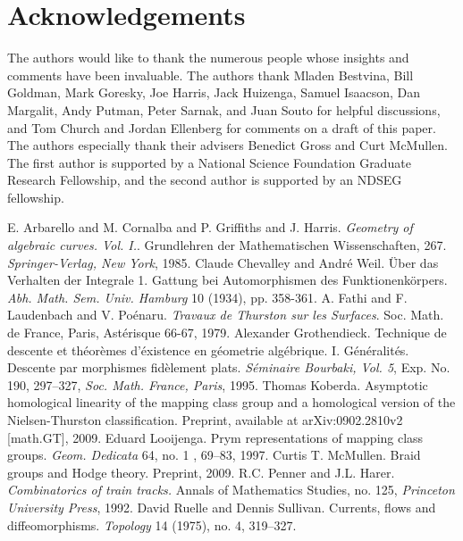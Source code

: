 \documentclass[11pt]{amsart}
\numberwithin{thm}{section}
\begin{document}
\section{Acknowledgements}
The authors would like to thank the numerous people whose insights and comments have been invaluable.  The authors thank Mladen Bestvina, Bill Goldman, Mark Goresky, Joe Harris, Jack Huizenga, Samuel Isaacson, Dan Margalit, Andy Putman, Peter Sarnak, and Juan Souto for helpful discussions, and Tom Church and Jordan Ellenberg for comments on a draft of this paper.  The authors especially thank their advisers Benedict Gross and Curt McMullen.  The first author is supported by a National Science Foundation Graduate Research Fellowship, and the second author is supported by an NDSEG fellowship.

\begin{thebibliography}{99}
E. Arbarello and M. Cornalba and P. Griffiths and J. Harris.  {\it Geometry of algebraic curves. Vol. I.}.  Grundlehren der Mathematischen Wissenschaften, 267.  {\it Springer-Verlag, New York}, 1985.
Claude Chevalley and Andr\'e Weil.  \"Uber das Verhalten der Integrale 1. Gattung bei Automorphismen des Funktionenk\"orpers.  {\it Abh. Math. Sem. Univ. Hamburg} 10 (1934), pp. 358-361.
A. Fathi and F. Laudenbach and V. Po\'enaru.  {\it Travaux de Thurston sur les Surfaces}.  Soc. Math. de France, Paris,  Ast\'erisque 66-67,  1979.
Alexander Grothendieck.  Technique de descente et th\'eor\`emes d'\'existence en g\'eometrie alg\'ebrique. I. G\'en\'eralit\'es. Descente par morphismes fid\`element plats.  {\it S\'eminaire Bourbaki, Vol. 5}, Exp. No. 190, 297--327, {\it Soc. Math. France, Paris}, 1995.
Thomas Koberda.  Asymptotic homological linearity of the mapping class group and a homological version of the Nielsen-Thurston classification.  Preprint, available at arXiv:0902.2810v2 [math.GT], 2009.
Eduard Looijenga.  Prym representations of mapping class groups.  {\it Geom. Dedicata} 64, no. 1 , 69--83, 1997.
Curtis T. McMullen.  Braid groups and Hodge theory.  Preprint, 2009.
R.C. Penner and J.L. Harer.  {\it Combinatorics of train tracks.}  Annals of Mathematics Studies, no. 125, {\it Princeton University Press}, 1992.
David Ruelle and Dennis Sullivan.  Currents, flows and diffeomorphisms.  {\it Topology} 14 (1975), no. 4, 319--327.
\end{thebibliography}
\end{document}
